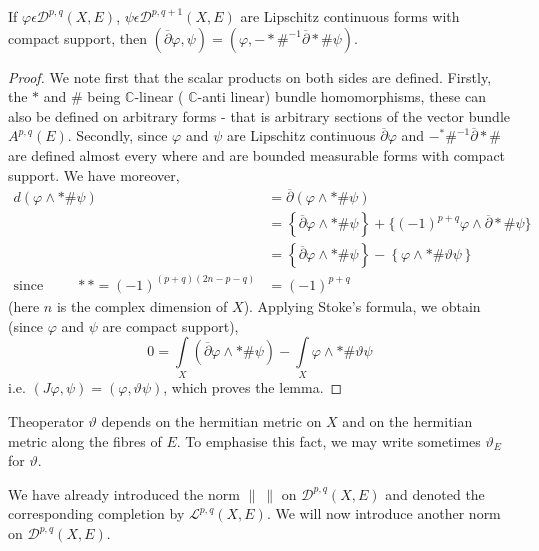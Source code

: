 \begin{lemma}%
  If $ \varphi \epsilon
  \mathscr{D}^{p,q}(X,E)$, $\psi \epsilon \mathscr{D}^{p,q+1} (X,E) $
  are Lipschitz continuous forms with compact support, then
  $(\overline{\partial} \varphi, \psi) = (\varphi, -* \#^{-1} 
  \overline{\partial} * \# \psi)$. 
\end{lemma}

\begin{proof} 
  We note first that the scalar products on both sides are
  defined. Firstly, the $*$ and $\#$  being $\mathbb{C}$-linear (\resp
  $\mathbb{C}$-anti linear)
  bundle homomorphisms, these can also be defined on arbitrary forms -
  that is arbitrary sections of the vector bundle $ A^{p,q}(E)$.
  Secondly, since $\varphi$ and $\psi$ are Lipschitz
  continuous $ \overline{\partial} \varphi$ and  $-^{*} \#^{-1}
  \overline{\partial} * \# $ are defined almost every where and are
  bounded measurable forms with compact support. We have moreover,     
{\fontsize{9}{11}\selectfont 
 $$ 
  \begin{aligned}
    d (\varphi \wedge * \# \psi) & = \overline{\partial}(\varphi \wedge *
    \# \psi) \\ 
    & = \left\{\overline{\partial} \varphi \wedge * \# \psi
    \right\}+\{(-1)^{p+q} 
    \varphi \wedge \overline{\partial}* \# \psi\}\qquad \\ 
    & = \left\{\overline{\partial} \varphi \wedge * \# \psi\right\} -
    \left\{\varphi \wedge * \# \vartheta \psi\right\} \\ 
    \text{since } \qquad ** = (-1)^{(p+q)(2n-p-q)} & =
    (-1)^{p+q} 
  \end{aligned} 
  $$}\relax 
  (here $n$ is the complex dimension of $X$). Applying Stoke's formula,
  we obtain (since $\varphi$ and $\psi$ are compact support), 
$$
0 = \underset{X}{\int} 
  (\overline{\partial} \varphi \wedge * \# \psi ) - \underset{X}{\int}
  \varphi \wedge * \# \vartheta \psi
$$
i.e. $(J \varphi, \psi) = (\varphi , \vartheta \psi)$,  which proves
the lemma.  
\end{proof}

  The\pageoriginale operator $ \vartheta $ depends on the hermitian
  metric on  $X$ and on the hermitian metric along the fibres of
  $E$. To emphasise this fact, we may write sometimes $ \vartheta_{E}$
  for $\vartheta $.   

We have already introduced the norm $ \| ~ \|$ on $
\mathscr{D}^{p,q}(X,E)$ and denoted the corresponding completion by $
\mathcal{L}^{p,q}(X,E)$. We will  now introduce another norm on $
\mathscr{D}^{p,q}(X,E)$.  

